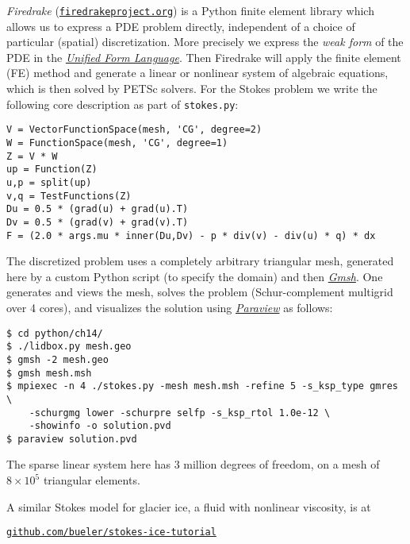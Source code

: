 \documentclass[12pt]{amsart}
\begin{document}
\emph{Firedrake} (\href{https://www.firedrakeproject.org/}{\texttt{firedrakeproject.org}}) is a Python finite element library which allows us to express a PDE problem directly, independent of a choice of particular (spatial) discretization.  More precisely we express the \emph{weak form} of the PDE in the \href{https://fenics.readthedocs.io/projects/ufl/en/latest/}{\emph{Unified Form Language}}.  Then Firedrake will apply the finite element (FE) method and generate a linear or nonlinear system of algebraic equations, which is then solved by PETSc solvers.  For the Stokes problem we write the following core description as part of \texttt{stokes.py}:

\medskip
\begin{Verbatim}[fontsize=\footnotesize,xleftmargin=10mm]
V = VectorFunctionSpace(mesh, 'CG', degree=2)
W = FunctionSpace(mesh, 'CG', degree=1)
Z = V * W
up = Function(Z)
u,p = split(up)
v,q = TestFunctions(Z)
Du = 0.5 * (grad(u) + grad(u).T)
Dv = 0.5 * (grad(v) + grad(v).T)
F = (2.0 * args.mu * inner(Du,Dv) - p * div(v) - div(u) * q) * dx
\end{Verbatim}

\medskip
The discretized problem uses a completely arbitrary triangular mesh, generated here by a custom Python script (to specify the domain) and then \href{https://gmsh.info/}{\emph{Gmsh}}.  One generates and views the mesh, solves the problem (Schur-complement multigrid over 4 cores), and visualizes the solution using \href{https://www.paraview.org/}{\emph{Paraview}} as follows:

\medskip
\begin{Verbatim}[fontsize=\small]
$ cd python/ch14/
$ ./lidbox.py mesh.geo
$ gmsh -2 mesh.geo
$ gmsh mesh.msh
$ mpiexec -n 4 ./stokes.py -mesh mesh.msh -refine 5 -s_ksp_type gmres \
    -schurgmg lower -schurpre selfp -s_ksp_rtol 1.0e-12 \
    -showinfo -o solution.pvd
$ paraview solution.pvd
\end{Verbatim}

\medskip
\noindent The sparse linear system here has $3$ million degrees of freedom, on a mesh of $8 \times 10^5$ triangular elements.

\bigskip
A similar Stokes model for glacier ice, a fluid with nonlinear viscosity, is at

\centerline{\small \href{https://github.com/bueler/stokes-ice-tutorial}{\texttt{github.com/bueler/stokes-ice-tutorial}}}
\end{document}
